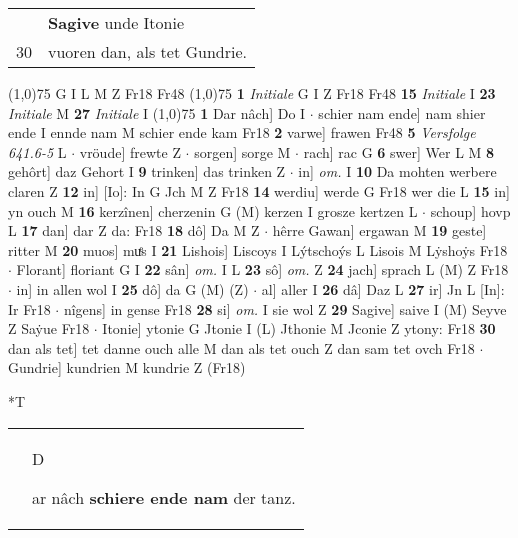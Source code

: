 \documentclass[8pt,a4paper,notitlepage]{article}
\begin{document}
\begin{table}[ht]
\begin{minipage}[t]{0.5\linewidth}
\begin{tabular}{rl}
 & \textbf{Sagive} unde Itonie\\ 
30 & vuoren dan, als tet Gundrie.\\ 
\end{tabular}
\scriptsize
\line(1,0){75} \newline
G I L M Z Fr18 Fr48 \newline
\line(1,0){75} \newline
\textbf{1} \textit{Initiale} G I Z Fr18 Fr48  \textbf{15} \textit{Initiale} I  \textbf{23} \textit{Initiale} M  \textbf{27} \textit{Initiale} I  \newline
\line(1,0){75} \newline
\textbf{1} Dar nâch] Do I  $\cdot$ schier nam ende] nam shier ende I ennde nam M schier ende kam Fr18 \textbf{2} varwe] frawen Fr48 \textbf{5} \textit{Versfolge 641.6-5} L   $\cdot$ vröude] frewte Z  $\cdot$ sorgen] sorge M  $\cdot$ rach] rac G \textbf{6} swer] Wer L M \textbf{8} gehôrt] daz Gehort I \textbf{9} trinken] das trinken Z  $\cdot$ in] \textit{om.} I \textbf{10} Da mohten werbere claren Z \textbf{12} in] [Io]: In G Jch M Z Fr18 \textbf{14} werdiu] werde G Fr18 wer die L \textbf{15} in] yn ouch M \textbf{16} kerzînen] cherzenin G (M) kerzen I grosze kertzen L  $\cdot$ schoup] hovp L \textbf{17} dan] dar Z da: Fr18 \textbf{18} dô] Da M Z  $\cdot$ hêrre Gawan] ergawan M \textbf{19} geste] ritter M \textbf{20} muos] muͤs I \textbf{21} Lishois] Liscoys I Lýtschoýs L Lisois M Lẏshoẏs Fr18  $\cdot$ Florant] floriant G I \textbf{22} sân] \textit{om.} I L \textbf{23} sô] \textit{om.} Z \textbf{24} jach] sprach L (M) Z Fr18  $\cdot$ in] in allen wol I \textbf{25} dô] da G (M) (Z)  $\cdot$ al] aller I \textbf{26} dâ] Daz L \textbf{27} ir] Jn L [In]: Ir Fr18  $\cdot$ nîgens] in gense Fr18 \textbf{28} si] \textit{om.} I sie wol Z \textbf{29} Sagive] saive I (M) Seyve Z Saẏue Fr18  $\cdot$ Itonie] ytonie G Jtonie I (L) Jthonie M Jconie Z ytony: Fr18 \textbf{30} dan als tet] tet danne ouch alle M dan als tet ouch Z dan sam tet ovch Fr18  $\cdot$ Gundrie] kundrien M kundrie Z (Fr18) \newline
\end{minipage}
\hspace{0.5cm}
\begin{minipage}[t]{0.5\linewidth}
\small
\begin{center}*T
\end{center}
\begin{tabular}{rl}
 & \begin{large}D\end{large}ar nâch \textbf{schiere ende nam} der tanz.\\ 

\end{tabular}
\end{minipage}
\end{table}
\end{document}
